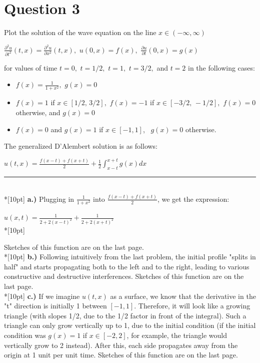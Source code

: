 \documentclass{article}
\begin{document}
\section{Question 3}
Plot the solution of the wave equation on the line \(x\in (-\infty , \infty)\)
\begin{center}
    \(\displaystyle \frac{\partial^2u}{\partial t^2}(t, x) = \frac{\partial^2u}{\partial x^2}(t, x), \,\, u(0, x) = f(x), \,\, \frac{\partial u}{\partial t}(0, x) = g(x)\)
\end{center}
for values of time \(t = 0, \,\, t = 1/2, \,\, t = 1, \,\, t = 3/2,\) and \(t = 2\) in the following cases:
\begin{itemize}
    \item \(\displaystyle f(x) = \frac{1}{1+x^2}, \,\, g(x) = 0\)
    \item \(f(x) = 1\) if \(x \in [1/2, \, 3/2], \,\, f(x) = -1\) if \(x\in [-3/2, \, -1/2], \,\, f(x) = 0\) otherwise, and \(g(x) = 0\)
    \item \(f(x) = 0\) and \(g(x) = 1\) if \(x\in [-1, 1]\), \, \(g(x) = 0\) otherwise. \\
\end{itemize}
The generalized D'Alembert solution is as follows:
\begin{center}
    \(\displaystyle u(t, x) = \frac{f(x - t) + f(x + t)}{2} + \frac{1}{2}\int_{x - t}^{x + t}g(x)dx\)
\end{center}
\rule{\linewidth}{0.2mm}\\*[10pt]
\textbf{a.)} Plugging in \(\displaystyle\frac{1}{1 + x^2}\) into \(\displaystyle\frac{f(x - t) + f(x + t)}{2}\), we get the expression:
\begin{center}
    \(\displaystyle u(x, t) = \frac{1}{2 + 2(x - t)^2} + \frac{1}{2 + 2(x + t)^2}\)\\*[10pt]
\end{center}
Sketches of this function are on the last page. \\*[10pt]
\textbf{b.)} Following intuitively from the last problem, the initial profile "splits in half" and starts propagating both to the left and to the right, leading to various constructive and destructive interferences. Sketches of this function are on the last page. \\*[10pt]
\textbf{c.)} If we imagine \(u(t, x)\) as a surface, we know that the derivative in the "t" direction is initially 1 between \([-1, 1]\). Therefore, it will look like a growing triangle (with slopes 1/2, due to the 1/2 factor in front of the integral). Such a triangle can only grow vertically up to 1, due to the initial condition (if the initial condition was \(g(x) = 1\) if \(x\in [-2, 2]\), for example, the triangle would vertically grow to 2 instead). After this, each side propagates away from the origin at 1 unit per unit time. Sketches of this function are on the last page. 
\end{document}

